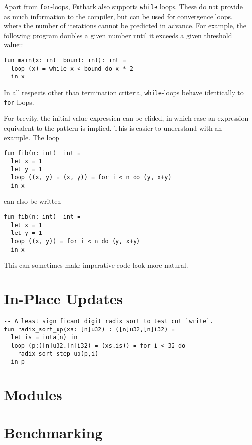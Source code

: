 \documentclass[11pt]{book}
\begin{document}
Apart from \texttt{for}-loops, Futhark also supports \texttt{while}
loops.  These do not provide as much information to the compiler, but
can be used for convergence loops, where the number of iterations
cannot be predicted in advance.  For example, the following program
doubles a given number until it exceeds a given threshold value::

\begin{lstlisting}
fun main(x: int, bound: int): int =
  loop (x) = while x < bound do x * 2
  in x
\end{lstlisting}

In all respects other than termination criteria, \texttt{while}-loops
behave identically to \texttt{for}-loops.

For brevity, the initial value expression can be elided, in which case
an expression equivalent to the pattern is implied.  This is easier to
understand with an example.  The loop

\begin{lstlisting}
fun fib(n: int): int =
  let x = 1
  let y = 1
  loop ((x, y) = (x, y)) = for i < n do (y, x+y)
  in x
\end{lstlisting}

can also be written

\begin{lstlisting}
fun fib(n: int): int =
  let x = 1
  let y = 1
  loop ((x, y)) = for i < n do (y, x+y)
  in x
\end{lstlisting}

This can sometimes make imperative code look more natural.

\section{In-Place Updates}
\label{sec:in-place-updates}

\begin{lstlisting}
-- A least significant digit radix sort to test out `write`.
fun radix_sort_up(xs: [n]u32) : ([n]u32,[n]i32) =
  let is = iota(n) in
  loop (p:([n]u32,[n]i32) = (xs,is)) = for i < 32 do
    radix_sort_step_up(p,i)
  in p
\end{lstlisting}


\section{Modules}

\section{Benchmarking}
\label{sec:benchmarking}
\end{document}
